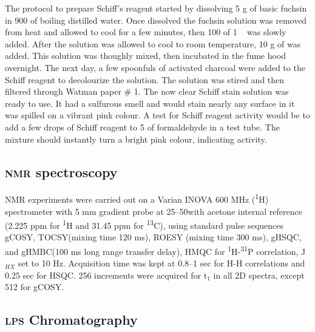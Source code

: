 		The protocol to prepare Schiff's reagent started by dissolving 5 \si{\gram} of basic fuchsin in 900 \millilitre of boiling distilled water. Once dissolved the fuchsin solution was removed from heat and allowed to cool for a few minutes, then 100 \millilitre of 1 \molar\  was slowly added. After the solution was allowed to cool to room temperature, 10 \si{\gram} of  was added. This solution was thoughly mixed, then incubated in the fume hood overnight. The next day, a few spoonfuls of activated charcoal were added to the Schiff reagent to decolourize the solution. The solution was stired and then filtered through Watman paper \# 1. The now clear Schiff stain solution was ready to use. It had a sulfurous smell and would stain nearly any surface in it was spilled on a vibrant pink colour. A test for Schiff reagent activity would be to add a few drops of Schiff reagent to 5 \millilitre of formaldehyde in a test tube. The mixture should instantly turn a bright pink colour, indicating activity.

	\subsection{\textsc{nmr} spectroscopy} %
	\label{sub:nmr_spectroscopy}

		\ac{NMR} experiments were carried out on a Varian INOVA 600 \si{\mega\hertz} (\textsuperscript{1}H) spectrometer with 5 \si{\milli\meter} gradient probe at 25--50\cel with acetone internal reference (2.225 ppm for \textsuperscript{1}H and 31.45 ppm for \textsuperscript{13}C), using standard pulse sequences \ac{gCOSY}, \ac{TOCSY}(mixing time 120 \si{\milli\second}), \ac{ROESY} (mixing time 300 \si{\milli\second}),  \ac{gHSQC}, and \ac{gHMBC}(100 \si{\milli\second} long range transfer delay), \ac{HMQC} for \textsuperscript{1}H-\textsuperscript{31}P correlation, J$_{HX}$ set to 10 \si{\hertz}. Acquisition time was kept at 0.8--1 sec for H-H correlations and 0.25 sec for \ac{HSQC}. 256 increments were acquired for t$_1$ in all 2D spectra, except 512 for \ac{gCOSY}.

	\subsection{\textsc{lps} Chromatography} %
	\label{sub:chromatography}

